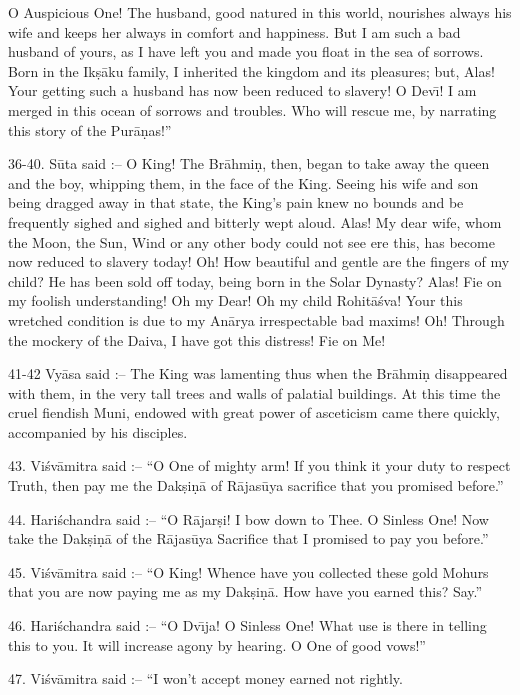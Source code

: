 O Auspicious One! The husband, good natured in this world, nourishes always his wife and keeps her always in comfort and happiness. But I am such a bad husband of yours, as I have left you and made you float in the sea of sorrows. Born in the Ik\d{s}\=aku family, I inherited the kingdom and its pleasures; but, Alas! Your getting such a husband has now been reduced to slavery! O Dev\={\i}! I am merged in this ocean of sorrows and troubles. Who will rescue me, by narrating this story of the Pur\=a\d{n}as!''

36-40. S\=uta said :-- O King! The Br\=ahmi\d{n}, then, began to take away the queen and the boy, whipping them, in the face of the King. Seeing his wife and son being dragged away in that state, the King's pain knew no bounds and be frequently sighed and sighed and bitterly wept aloud. Alas! My dear wife, whom the Moon, the Sun, Wind or any other body could not see ere this, has become now reduced to slavery today! Oh! How beautiful and gentle are the fingers of my child? He has been sold off today, being born in the Solar Dynasty? Alas! Fie on my foolish understanding! Oh my Dear! Oh my child Rohit\=a\'sva! Your this wretched condition is due to my An\=arya irrespectable bad maxims! Oh! Through the mockery of the Daiva, I have got this distress! Fie on Me!

41-42 Vy\=asa said :-- The King was lamenting thus when the Br\=ahmi\d{n} disappeared with them, in the very tall trees and walls of palatial buildings. At this time the cruel fiendish Muni, endowed with great power of asceticism came there quickly, accompanied by his disciples.

43. Vi\'sv\=amitra said :-- ``O One of mighty arm! If you think it your duty to respect Truth, then pay me the Dak\d{s}i\d{n}\=a of R\=ajas\=uya sacrifice that you promised before.''

44. Hari\'schandra said :-- ``O R\=ajar\d{s}i! I bow down to Thee. O Sinless One! Now take the Dak\d{s}i\d{n}\=a of the R\=ajas\=uya Sacrifice that I promised to pay you before.''

45. Vi\'sv\=amitra said :-- ``O King! Whence have you collected these gold Mohurs that you are now paying me as my Dak\d{s}i\d{n}\=a. How have you earned this? Say.''

46. Hari\'schandra said :-- ``O Dv\={\i}ja! O Sinless One! What use is there in telling this to you. It will increase agony by hearing. O One of good vows!''

47. Vi\'sv\=amitra said :-- ``I won't accept money earned not rightly.

